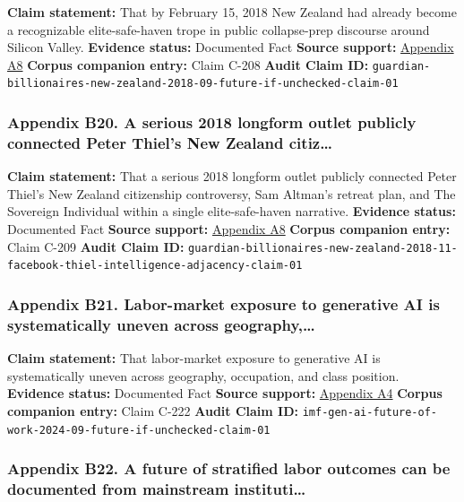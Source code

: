 \documentclass[
  american,
  11pt,
  letterpaper,
]{article}
\begin{document}
\textbf{Claim statement:} That by February 15, 2018 New Zealand had
already become a recognizable elite-safe-haven trope in public
collapse-prep discourse around Silicon Valley. \textbf{Evidence status:}
Documented Fact \textbf{Source support:}
\hyperref[ch-09-appendix-a8-why-silicon-valley-billionaires-are-prepping-for-the-apocalypse-in-new-zealand]{Appendix
A8} \textbf{Corpus companion entry:} Claim C-208 \textbf{Audit Claim
ID:}
\texttt{guardian-billionaires-new-zealand-2018-09-future-if-unchecked-claim-01}

\subsubsection{Appendix B20. A serious 2018 longform outlet publicly
connected Peter Thiel's New Zealand
citiz\ldots{}}\label{ch-09-appendix-b20-a-serious-2018-longform-outlet-publicly-connected-peter-thiel-s-new-zealand-citiz}

\textbf{Claim statement:} That a serious 2018 longform outlet publicly
connected Peter Thiel's New Zealand citizenship controversy, Sam
Altman's retreat plan, and The Sovereign Individual within a single
elite-safe-haven narrative. \textbf{Evidence status:} Documented Fact
\textbf{Source support:}
\hyperref[ch-09-appendix-a8-why-silicon-valley-billionaires-are-prepping-for-the-apocalypse-in-new-zealand]{Appendix
A8} \textbf{Corpus companion entry:} Claim C-209 \textbf{Audit Claim
ID:}
\texttt{guardian-billionaires-new-zealand-2018-11-facebook-thiel-intelligence-adjacency-claim-01}

\subsubsection{Appendix B21. Labor-market exposure to generative AI is
systematically uneven across
geography,\ldots{}}\label{ch-09-appendix-b21-labor-market-exposure-to-generative-ai-is-systematically-uneven-across-geography}

\textbf{Claim statement:} That labor-market exposure to generative AI is
systematically uneven across geography, occupation, and class position.
\textbf{Evidence status:} Documented Fact \textbf{Source support:}
\hyperref[ch-09-appendix-a4-gen-ai-artificial-intelligence-and-the-future-of-work]{Appendix
A4} \textbf{Corpus companion entry:} Claim C-222 \textbf{Audit Claim
ID:}
\texttt{imf-gen-ai-future-of-work-2024-09-future-if-unchecked-claim-01}

\subsubsection{Appendix B22. A future of stratified labor outcomes can
be documented from mainstream
instituti\ldots{}}\label{ch-09-appendix-b22-a-future-of-stratified-labor-outcomes-can-be-documented-from-mainstream-instituti}
\end{document}
